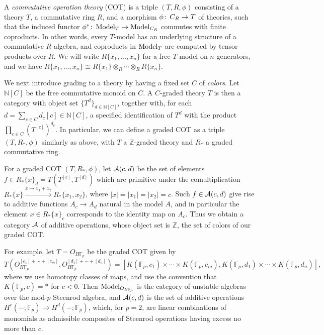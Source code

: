 \documentclass{gtpart}
\theoremstyle{definition}
\theoremstyle{remark}
\def\co{\colon\thinspace}
\newcommand{\mb}[1]{\mathbb{#1}}
\newcommand{\Model}{{\rm Model}}
\begin{document}
A {\em commutative operation theory} (COT) is a triple $(T,R,\phi)$ 
consisting of a theory $T$, a commutative ring $R$, and a morphism 
$\phi\co C_R \to T$ of theories, such that the induced functor $\phi^*\co 
\Model_T \to \Model_{C_R}$ commutes with finite coproducts.  
In other words, every $T$-model has an underlying structure of 
a commutative $R$-algebra, and coproducts in $\Model_T$ are computed 
by tensor products over $R$.  We will write $R\{x_1,...,x_n\}$ for 
a free $T$-model on $n$ generators, and we have $R\{x_1,...,x_n\} \cong 
R\{x_1\} \otimes_R \cdots \otimes_R R\{x_n\}$.  

We next introduce grading to a theory by having a fixed set 
$C$ of {\em colors}.  Let ${\mb N}[C]$ be the free commutative monoid 
on $C$.  A $C$-graded theory $T$ is then a category with object set 
$\{T^d\}_{d \in {\mb N}[C]}$, together with, for each 
$d = \sum_{c \in C} d_c[c] \in {\mb N}[C]$, a specified identification of 
$T^d$ with the product $\prod_{c \in C} (T^{[c]})^{d_c}$.  
In particular, we can define a graded COT as 
a triple $(T,R_*,\phi)$ similarly as above, with $T$ a $\mb Z$-graded theory 
and $R_*$ a graded commutative ring.  

For a graded COT $(T,R_*,\phi)$, let ${\cal A}(c,d)$ 
be the set of elements $f \in R_*\{x\}_d = T(T^{[c]},T^{[d]})$ which are 
primitive under the comultiplication $R_*\{x\} \xrightarrow{x \mapsto x_1 + x_2} R_*\{x_1,x_2\}$, where $|x| = |x_1| = |x_2| = c$.  
Such $f \in {\cal A}(c,d)$ give rise to additive functions $A_c \to A_d$ 
natural in the model $A$, and in particular the element $x \in R_*\{x\}_c$ 
corresponds to the identity map on $A_c$.  Thus we obtain a category $\cal A$ 
of additive operations, whose object set is $\mb Z$, the set of colors of 
our graded COT.  

For example, let $T = O_{H{\mb F}_p}$ be the graded COT given by 
\[
 T(O_{H{\mb F}_p}^{[c_1]+\cdots+[c_m]},O_{H{\mb F}_p}^{[d_1]+\cdots+[d_n]}) = [K({\mb F}_p,c_1) \times \cdots \times K({\mb F}_p,c_m), K({\mb F}_p,d_1) \times \cdots \times K({\mb F}_p,d_n)],
\]
where we use homotopy classes of maps, and use the convention that $K({\mb F}_p,c) = *$ for $c<0$.  
Then $\Model_{O_{H{\mb F}_p}}$ is the category of unstable algebras over the mod-$p$ Steenrod algebra, 
and ${\cal A}(c,d)$ is the set of additive operations $H^c(-;{\mb F}_p) \to H^d(-;{\mb F}_p)$, which, 
for $p=2$, are linear combinations of monomials as admissible composites of Steenrod operations having excess no more than $c$.  
\end{document}
